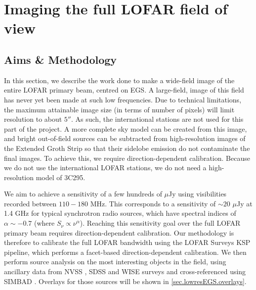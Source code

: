 \chapter{Imaging the full LOFAR field of view}\label{section.EGS.lowres}
\minitoc
\section{Aims \& Methodology}

\pg
In this section, we describe the work done to make a wide-field image of the entire LOFAR primary beam, centred on EGS. A large-field, image of this field has never yet been made at such low frequencies. Due to technical limitations, the maximum attainable image size (in terms of number of pixels) will limit resolution to about $5''$. As such, the international stations are not used for this part of the project.
A more complete sky model can be created from this image, and %
bright out-of-field sources can be subtracted from high-resolution images of the Extended Groth Strip so that their sidelobe emission do not contaminate the final images. To achieve this, we require direction-dependent calibration. Because we do not use the international LOFAR stations, we do not need a high-resolution model of 3C295. %

\pg
We aim to achieve a sensitivity of a few hundreds of $\mu$Jy using visibilities recorded between $110-180$ MHz. This corresponds to a sensitivity of $\sim20$ $\mu$Jy at 1.4 GHz for typical synchrotron radio sources, which have spectral indices of $\alpha\sim -0.7$ (where $S_\nu \propto \nu^\alpha$). Reaching this sensitivity goal over the full LOFAR primary beam requires direction-dependent calibration.
Our methodology is therefore to calibrate the full LOFAR bandwidth using the LOFAR Surveys KSP pipeline, which performs a facet-based direction-dependent calibration. We then perform source analysis on the most interesting objects in the field, using ancillary data from NVSS , SDSS  and WISE  surveys and cross-referenced using SIMBAD . Overlays for those sources will be shown in \cref{sec.lowresEGS.overlays}.


